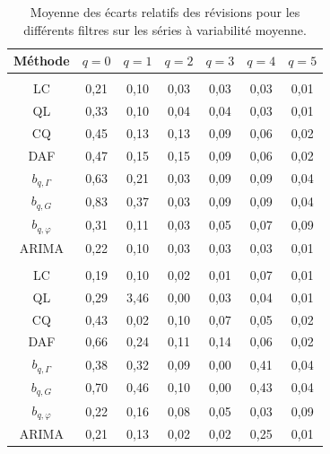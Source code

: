 \documentclass[
  12pt,
  a4paper,french]{article}
\newcommand\1{\mathds{1}}
\begin{document}
\begin{table}[!h]

\caption{\label{tab:simulrev}Moyenne des écarts relatifs des révisions pour les différents filtres sur les séries à variabilité moyenne.}
\centering
\begin{tabular}[t]{ccccccc}
\toprule
Méthode & $q=0$ & $q=1$ & $q=2$ & $q=3$ & $q=4$ & $q=5$\\
\midrule
\addlinespace[0.3em]
\multicolumn{7}{l}{\textbf{$MAE_{fe}(q) = \mathbb E\left[\left|(y_{t|t+q} -  y_{t|last})/y_{t|last}\right|\right]$}}\\
\hspace{1em}LC & 0,21 & 0,10 & 0,03 & 0,03 & 0,03 & 0,01\\
\hspace{1em}QL & 0,33 & 0,10 & 0,04 & 0,04 & 0,03 & 0,01\\
\hspace{1em}CQ & 0,45 & 0,13 & 0,13 & 0,09 & 0,06 & 0,02\\
\hspace{1em}DAF & 0,47 & 0,15 & 0,15 & 0,09 & 0,06 & 0,02\\
\hspace{1em}$b_{q,\Gamma}$ & 0,63 & 0,21 & 0,03 & 0,09 & 0,09 & 0,04\\
\hspace{1em}$b_{q,G}$ & 0,83 & 0,37 & 0,03 & 0,09 & 0,09 & 0,04\\
\hspace{1em}$b_{q,\varphi}$ & 0,31 & 0,11 & 0,03 & 0,05 & 0,07 & 0,09\\
\hspace{1em}ARIMA & 0,22 & 0,10 & 0,03 & 0,03 & 0,03 & 0,01\\
\addlinespace[0.3em]
\multicolumn{7}{l}{\textbf{$MAE_{ce}(q)=\mathbb E\left[
\left|(y_{t|t+q} - y_{t|t+q+1})/y_{t|t+q+1}\right|
\right]$}}\\
\hspace{1em}LC & 0,19 & 0,10 & 0,02 & 0,01 & 0,07 & 0,01\\
\hspace{1em}QL & 0,29 & 3,46 & 0,00 & 0,03 & 0,04 & 0,01\\
\hspace{1em}CQ & 0,43 & 0,02 & 0,10 & 0,07 & 0,05 & 0,02\\
\hspace{1em}DAF & 0,66 & 0,24 & 0,11 & 0,14 & 0,06 & 0,02\\
\hspace{1em}$b_{q,\Gamma}$ & 0,38 & 0,32 & 0,09 & 0,00 & 0,41 & 0,04\\
\hspace{1em}$b_{q,G}$ & 0,70 & 0,46 & 0,10 & 0,00 & 0,43 & 0,04\\
\hspace{1em}$b_{q,\varphi}$ & 0,22 & 0,16 & 0,08 & 0,05 & 0,03 & 0,09\\
\hspace{1em}ARIMA & 0,21 & 0,13 & 0,02 & 0,02 & 0,25 & 0,01\\
\bottomrule
\end{tabular}
\end{table}
\end{document}
